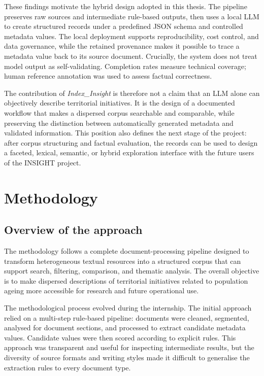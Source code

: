 \documentclass[
11pt,
english,
singlespacing,
headsepline,
]{MastersDoctoralThesis}
\begin{document}
These findings motivate the hybrid design adopted in this thesis. The pipeline
preserves raw sources and intermediate rule-based outputs, then uses a local
LLM to create structured records under a predefined JSON schema and controlled
metadata values. The local deployment supports reproducibility, cost control,
and data governance, while the retained provenance makes it possible to trace a
metadata value back to its source document. Crucially, the system does not treat
model output as self-validating. Completion rates measure technical coverage;
human reference annotation was used to assess factual correctness.

The contribution of \textit{Index\_Insight} is therefore not a claim that an
LLM alone can objectively describe territorial initiatives. It is the design of
a documented workflow that makes a dispersed corpus searchable and comparable,
while preserving the distinction between automatically generated metadata and
validated information. This position also defines the next stage of the
project: after corpus structuring and factual evaluation, the records can be
used to design a faceted, lexical, semantic, or hybrid exploration interface
with the future users of the INSIGHT project.

\chapter{Methodology}

\section{Overview of the approach}

The methodology follows a complete document-processing pipeline designed to
transform heterogeneous textual resources into a structured corpus that can
support search, filtering, comparison, and thematic analysis. The overall
objective is to make dispersed descriptions of territorial initiatives related
to population ageing more accessible for research and future operational use.

The methodological process evolved during the internship. The initial approach
relied on a multi-step rule-based pipeline: documents were cleaned, segmented,
analysed for document sections, and processed to extract candidate metadata
values. Candidate values were then scored according to explicit rules. This
approach was transparent and useful for inspecting intermediate results, but the
diversity of source formats and writing styles made it difficult to generalise
the extraction rules to every document type.
\end{document}
